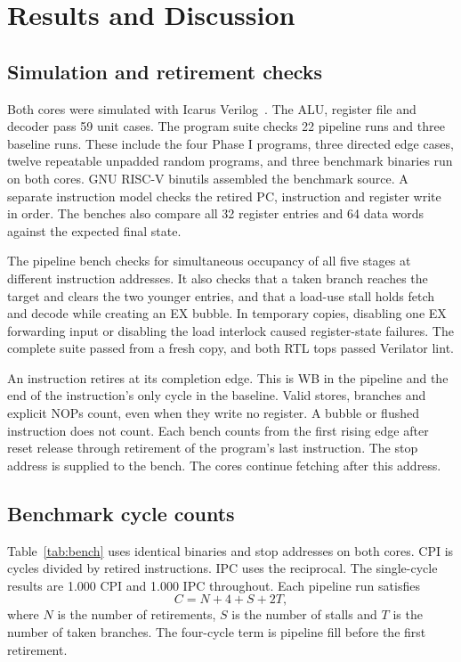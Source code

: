 \documentclass[conference]{IEEEtran}
\begin{document}
\section{Results and Discussion}
\subsection{Simulation and retirement checks}
Both cores were simulated with Icarus Verilog~\cite{icarus}. The ALU, register file and decoder pass 59 unit cases. The program suite checks 22 pipeline runs and three baseline runs. These include the four Phase I programs, three directed edge cases, twelve repeatable unpadded random programs, and three benchmark binaries run on both cores. GNU RISC-V binutils assembled the benchmark source. A separate instruction model checks the retired PC, instruction and register write in order. The benches also compare all 32 register entries and 64 data words against the expected final state.

The pipeline bench checks for simultaneous occupancy of all five stages at different instruction addresses. It also checks that a taken branch reaches the target and clears the two younger entries, and that a load-use stall holds fetch and decode while creating an EX bubble. In temporary copies, disabling one EX forwarding input or disabling the load interlock caused register-state failures. The complete suite passed from a fresh copy, and both RTL tops passed Verilator lint.

An instruction retires at its completion edge. This is WB in the pipeline and the end of the instruction's only cycle in the baseline. Valid stores, branches and explicit NOPs count, even when they write no register. A bubble or flushed instruction does not count. Each bench counts from the first rising edge after reset release through retirement of the program's last instruction. The stop address is supplied to the bench. The cores continue fetching after this address.

\subsection{Benchmark cycle counts}
Table~\ref{tab:bench} uses identical binaries and stop addresses on both cores. CPI is cycles divided by retired instructions. IPC uses the reciprocal. The single-cycle results are 1.000 CPI and 1.000 IPC throughout. Each pipeline run satisfies
\[
C = N + 4 + S + 2T ,
\]
where $N$ is the number of retirements, $S$ is the number of stalls and $T$ is the number of taken branches. The four-cycle term is pipeline fill before the first retirement.
\end{document}
